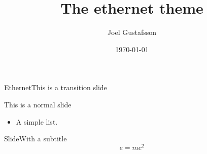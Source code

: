 \documentclass{beamer}
\title{\huge\textbf{The ethernet theme}}
\date{\today}
\author{Joel Gustafsson}
\begin{document}
\begin{frame}
  \titlepage
\end{frame}

\begin{frame}[transition]{Ethernet}{This is a transition slide}
\end{frame}


\begin{frame}{This is a normal slide}
  \begin{itemize}
    \item A simple list.
  \end{itemize}
\end{frame}

\begin{frame}{Slide}{With a subtitle}
  \begin{equation}
    e = mc^2
  \end{equation}
\end{frame}
\end{document}

